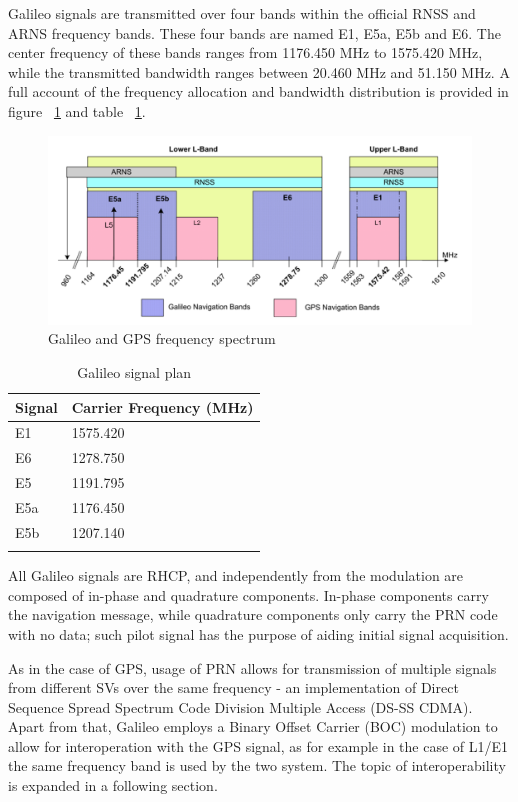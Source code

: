 \vspace{\baselineskip}

Galileo signals are transmitted over four bands within the official RNSS and
ARNS frequency bands. These four bands are named E1, E5a, E5b and E6. The center
frequency of these bands ranges from \num{1176.450} \si{MHz} to \num{1575.420}
\si{MHz}, while the transmitted bandwidth ranges between \num{20.460} \si{MHz}
and \num{51.150} \si{MHz}. A full account of the frequency allocation and
bandwidth distribution is provided in figure ~\ref{fig:galileo_frequencies} and
table ~\ref{table:galileo_signals}.

\begin{figure}[h!]
  \includegraphics[width=\linewidth]{figures/galileo_signal_plan.png}
  \caption{Galileo and GPS frequency spectrum}
  \label{fig:galileo_frequencies}
\end{figure}

\begin{longtable}[]{@{}ll@{}}
  \toprule
  Signal & Carrier Frequency (MHz)\tabularnewline
  \midrule
  \endhead
  E1 & 1575.420\tabularnewline
  E6 & 1278.750\tabularnewline
  E5 & 1191.795\tabularnewline
  E5a & 1176.450\tabularnewline
  E5b & 1207.140\tabularnewline
  \bottomrule
  \caption{Galileo signal plan}
  \label{table:galileo_signals}
\end{longtable}

All Galileo signals are RHCP, and independently from the modulation are composed
of in-phase and quadrature components. In-phase components carry the navigation
message, while quadrature components only carry the PRN code with no data; such
pilot signal has the purpose of aiding initial signal acquisition.

As in the case of GPS, usage of PRN allows for transmission of multiple signals
from different SVs over the same frequency - an implementation of Direct
Sequence Spread Spectrum Code Division Multiple Access (DS-SS CDMA). Apart from
that, Galileo employs a Binary Offset Carrier (BOC) modulation to allow for
interoperation with the GPS signal, as for example in the case of L1/E1 the same
frequency band is used by the two system. The topic of interoperability is
expanded in a following section.

